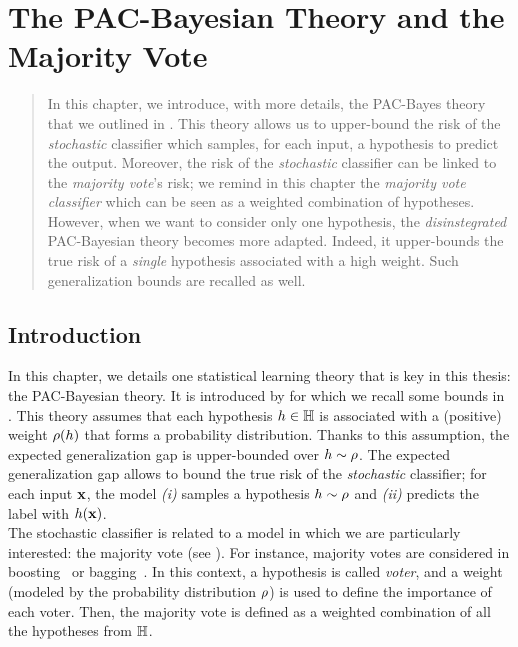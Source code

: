 \chapter[The PAC-Bayesian Theory and the Majority Vote]{The PAC-Bayesian Theory and the Majority Vote}
\label{chap:pac-bayes}
\addchapterlof
\addchapterloe
\addchapterloa

\minitoc

\begin{abstract}
    In this chapter, we introduce, with more details, the PAC-Bayes theory that we outlined in .
    This theory allows us to upper-bound the risk of the {\it stochastic} classifier which samples, for each input, a hypothesis to predict the output. 
    Moreover, the risk of the {\it stochastic} classifier can be linked to the {\it majority vote}'s risk;  we remind in this chapter the {\it majority vote classifier} which can be seen as a weighted combination of hypotheses.
    However, when we want to consider only one hypothesis, the {\it disinstegrated} PAC-Bayesian theory becomes more adapted.
    Indeed, it upper-bounds the true risk of a {\it single} hypothesis associated with a high weight.
    Such generalization bounds are recalled as well.
\end{abstract}

\newpage

\section{Introduction}

In this chapter, we details one statistical learning theory that is key in this thesis: the PAC-Bayesian theory.
It is introduced by \citet{ShaweTaylorWilliamson1997,McAllester1998} for which we recall some bounds in .
This theory assumes that each hypothesis $h\in\mathbb{H}$ is associated with a (positive) weight $\rho(h)$ that forms a probability distribution.
Thanks to this assumption, the expected generalization gap is upper-bounded over $h\sim\rho$. 
The expected generalization gap allows to bound the true risk of the {\it stochastic} classifier; for each input $\mathbf{x}$, the model {\it (i)} samples a hypothesis $h\sim\rho$ and {\it (ii)} predicts the label with $h(\mathbf{x})$.\\

The stochastic classifier is related to a model in which we are particularly interested: the majority vote (see ).
For instance, majority votes are considered in boosting~\citep{FreundSchapire1996} or bagging~\citep{Breiman1996}.
In this context, a hypothesis is called {\it voter}, and a weight (modeled by the probability distribution $\rho$) is used to define the importance of each voter.
Then, the majority vote is defined as a weighted combination of all the hypotheses from $\mathbb{H}$.\\


